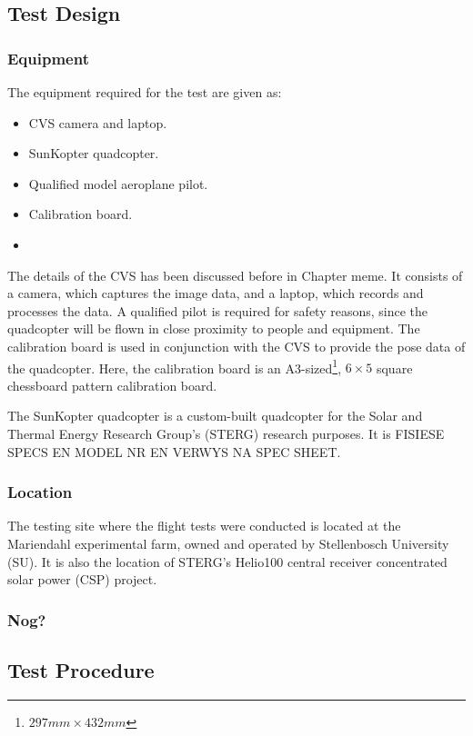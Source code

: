\subsection{Test Design}

\subsubsection{Equipment}

The equipment required for the test are given as:

\begin{itemize}
    \item CVS camera and laptop.
    \item SunKopter quadcopter.
    \item Qualified model aeroplane pilot.
    \item Calibration board.
    \item 
\end{itemize}

The details of the CVS has been discussed before in Chapter meme. It consists of a camera, which captures the image data, and a laptop, which records and processes the data. A qualified pilot is required for safety reasons, since the quadcopter will be flown in close proximity to people and equipment. The calibration board is used in conjunction with the CVS to provide the pose data of the quadcopter. Here, the calibration board is an A3-sized\footnote{$297mm\times432mm$}, $6\times5$ square chessboard pattern calibration board. 

The SunKopter quadcopter is a custom-built quadcopter for the Solar and Thermal Energy Research Group's (STERG) research purposes. It is FISIESE SPECS EN MODEL NR EN VERWYS NA SPEC SHEET\@.

\subsubsection{Location}

The testing site where the flight tests were conducted is located at the Mariendahl experimental farm, owned and operated by Stellenbosch University (SU). It is also the location of STERG's Helio100 central receiver concentrated solar power (CSP) project. 

\subsubsection{Nog?}

\subsection{Test Procedure}

